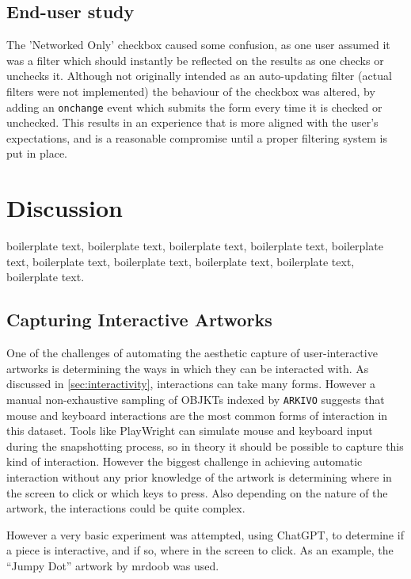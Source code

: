 \subsection{End-user study}


The 'Networked Only' checkbox caused some confusion, as one user assumed it was a filter which should instantly be reflected on the results as one checks or unchecks it. Although not originally intended as an auto-updating filter (actual filters were not implemented) the behaviour of the checkbox was altered, by adding an \texttt{onchange} event which submits the form every time it is checked or unchecked. This results in an experience that is more aligned with the user's expectations, and is a reasonable compromise until a proper filtering system is put in place.




\section{Discussion}


boilerplate text, boilerplate text, boilerplate text, boilerplate text, boilerplate text, boilerplate text, boilerplate text, boilerplate text, boilerplate text, boilerplate text.


\subsection{Capturing Interactive Artworks}
\label{subsec:capture-interactive}

One of the challenges of automating the aesthetic capture of user-interactive artworks is determining the ways in which they can be interacted with. As discussed in \autoref{sec:interactivity}, interactions can take many forms. However a manual non-exhaustive sampling of OBJKTs indexed by \texttt{ARKIVO} suggests that mouse and keyboard interactions are the most common forms of interaction in this dataset. Tools like PlayWright can simulate mouse and keyboard input during the snapshotting process, so in theory it should be possible to capture this kind of interaction. However the biggest challenge in achieving automatic interaction without any prior knowledge of the artwork is determining where in the screen to click or which keys to press. Also depending on the nature of the artwork, the interactions could be quite complex.

However a very basic experiment was attempted, using ChatGPT, to determine if a piece is interactive, and if so, where in the screen to click. As an example, the ``Jumpy Dot'' artwork by mrdoob was used.

